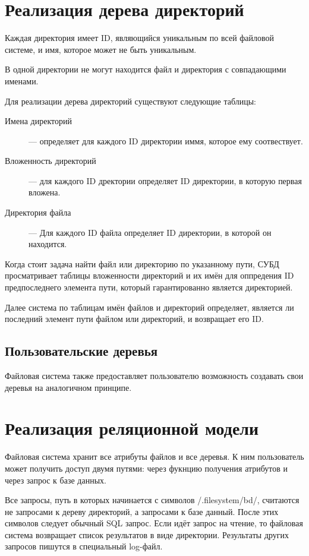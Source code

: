 \documentclass[pdftex,a4paper,11pt]{article}
\begin{document}
\section{Реализация дерева директорий}

Каждая директория имеет ID, являющийся уникальным по всей файловой системе, и имя, которое может не быть уникальным.

В одной директории не могут находится файл и директория с совпадающими именами.

Для реализации дерева директорий существуют следующие таблицы:

\begin{description}

\item[Имена директорий] --- определяет для каждого ID директории иммя, которое ему соотвествует.
\item[Вложенность директорий] --- для каждого ID дректории определяет ID директории, в которую первая вложена.
\item[Директория файла] --- Для каждого ID файла определяет ID директории, в которой он находится.
\end{description}

Когда стоит задача найти файл или директорию по указанному пути, СУБД просматривает таблицы вложенности директорий и их имён для оппредения ID предпоследнего элемента пути, который гарантированно является директорией.

Далее система по таблицам имён файлов и директорий определяет, является ли последний элемент пути файлом или директорий, и возвращает его ID.

\subsection{Пользовательские деревья}

Файловая система также предоставляет пользователю возможность создавать свои деревья на аналогичном принципе.

\section{Реализация реляционной модели}

Файловая система хранит все атрибуты файлов и все деревья. К ним пользователь может получить доступ двумя путями: через фукнцию получения атрибутов и через запрос к базе данных.

Все запросы, путь в которых начинается с символов \frqq{}/.filesystem/bd/\flqq{}, считаются не запросами к дереву директорий, а запросами к базе данный. После этих символов следует обычный SQL запрос. Если идёт запрос на чтение, то файловая система возвращает список результатов в виде директории. Результаты других запросов пишутся в специальный log-файл.
\end{document}
